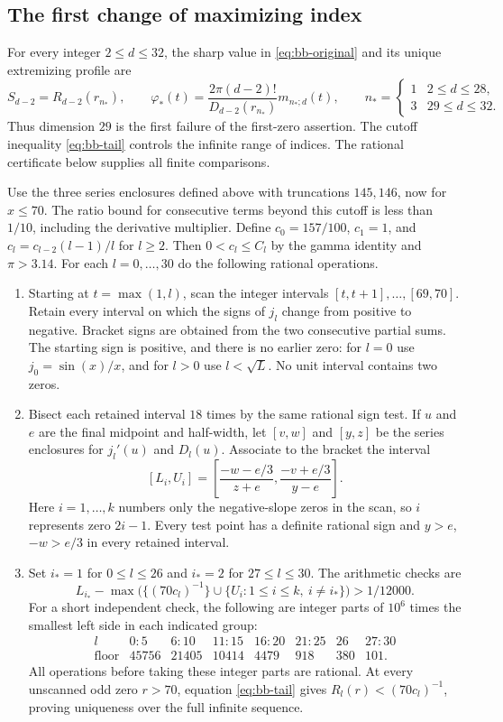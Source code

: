 \documentclass[11pt,a4paper]{article}
\theoremstyle{remark}\newtheorem{remark}[theorem]{Remark}
\numberwithin{equation}{section}
\begin{document}
\subsection{The first change of maximizing index}
For every integer $2\le d\le32$, the sharp value in
\eqref{eq:bb-original} and its unique extremizing profile are
\[
 S_{d-2}=R_{d-2}(r_{n_*}),\qquad
 \varphi_*(t)=\frac{2\pi(d-2)!}{D_{d-2}(r_{n_*})}m_{n_*;d}(t),
 \qquad n_*=\begin{cases}1&2\le d\le28,\\3&29\le d\le32.\end{cases}
\]
Thus dimension $29$ is the first failure of the first-zero assertion.
The cutoff inequality \eqref{eq:bb-tail} controls the infinite range of
indices. The rational certificate below supplies all finite comparisons.

Use the three series enclosures defined above with truncations $145,146$,
now for $x\le70$. The ratio bound for consecutive terms beyond this
cutoff is less than $1/10$, including the derivative multiplier.
Define $c_0=157/100$, $c_1=1$, and $c_l=c_{l-2}(l-1)/l$ for $l\ge2$.
Then $0<c_l\le C_l$ by the gamma identity and $\pi>3.14$.
For each $l=0,\ldots,30$ do the following rational operations.

\begin{enumerate}
\item Starting at $t=\max(1,l)$, scan the integer intervals
$[t,t+1],\ldots,[69,70]$. Retain every interval on which the signs of
$j_l$ change from positive to negative. Bracket signs are obtained from
the two consecutive partial sums. The starting sign is positive, and
there is no earlier zero: for $l=0$ use $j_0=\sin(x)/x$, and for $l>0$
use $l<\sqrt L$. No unit interval contains two zeros.
\item Bisect each retained interval $18$ times by the same rational sign
test. If $u$ and $e$ are the final midpoint and half-width, let
$[v,w]$ and $[y,z]$ be the series enclosures for $j_l'(u)$ and $D_l(u)$.
Associate to the bracket the interval
\[
 [L_i,U_i]=
 \left[\frac{-w-e/3}{z+e},\frac{-v+e/3}{y-e}\right].
\]
Here $i=1,\ldots,k$ numbers only the negative-slope zeros in the scan,
so $i$ represents zero $2i-1$. Every test point has a definite rational
sign and $y>e$, $-w>e/3$ in every retained interval.
\item Set $i_*=1$ for $0\le l\le26$ and $i_*=2$ for $27\le l\le30$.
The arithmetic checks are
\[
 L_{i_*}-\max\bigl(\{(70c_l)^{-1}\}\cup
                    \{U_i:1\le i\le k,\ i\ne i_*\}\bigr)>1/12000.
\]
For a short independent check, the following are integer parts of $10^6$
times the smallest left side in each indicated group:
\[
\begin{array}{c|rrrrrrr}
 l&0\!:\!5&6\!:\!10&11\!:\!15&16\!:\!20&21\!:\!25&26&27\!:\!30\\ \hline
 \text{floor}&45756&21405&10414&4479&918&380&101 .
\end{array}
\]
All operations before taking these integer parts are rational.
At every unscanned odd zero $r>70$, equation \eqref{eq:bb-tail} gives
$R_l(r)<(70c_l)^{-1}$, proving uniqueness over the full infinite sequence.
\end{enumerate}
\end{document}
